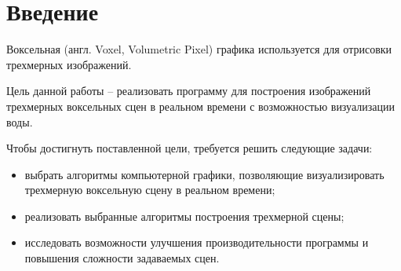 \chapter*{Введение}

Воксельная (англ. Voxel, Volumetric Pixel) графика используется для отрисовки 
трехмерных изображений. 

Цель данной работы -- реализовать программу для построения 
изображений трехмерных воксельных сцен в реальном времени
с возможностью визуализации воды.

Чтобы достигнуть поставленной цели, требуется решить следующие задачи:
\begin{itemize}
    \item выбрать алгоритмы компьютерной 
          графики, позволяющие визуализировать трехмерную воксельную
          сцену в реальном времени;
    \item реализовать выбранные алгоритмы построения трехмерной сцены;
    \item исследовать возможности улучшения производительности программы
          и повышения сложности задаваемых сцен.
\end{itemize}
